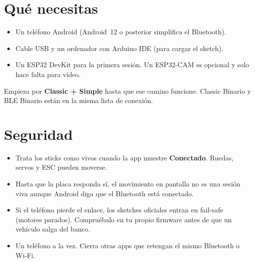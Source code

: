\documentclass[12pt,a4paper]{article}
\newcommand{\ui}[1]{\textsf{\textbf{#1}}}
\begin{document}
\begin{center}
\end{center}

\section{Qué necesitas}
\label{sec:need}

\begin{itemize}[leftmargin=1.4cm]
  \item Un teléfono Android (Android~12 o posterior simplifica el Bluetooth).
  \item Cable USB y un ordenador con Arduino IDE (para cargar el sketch).
  \item Un ESP32 DevKit para la primera sesión.
        Un ESP32-CAM es opcional y solo hace falta para vídeo.
\end{itemize}

Empieza por \ui{Classic + Simple} hasta que ese camino funcione.
Classic Binario y BLE Binario están en la misma lista de conexión.

\section{Seguridad}
\label{sec:safety}

\begin{itemize}[leftmargin=1.4cm]
  \item Trata los sticks como vivos cuando la app muestre \ui{Conectado}.
        Ruedas, servos y ESC pueden moverse.
  \item Hasta que la placa responda sí, el movimiento en pantalla no es una
        sesión viva aunque Android diga que el Bluetooth está conectado.
  \item Si el teléfono pierde el enlace, los sketches oficiales entran en
        fail-safe (motores parados). Compruébalo en tu propio firmware
        antes de que un vehículo salga del banco.
  \item Un teléfono a la vez. Cierra otras apps que retengan el mismo
        Bluetooth o Wi-Fi.
\end{itemize}
\end{document}
